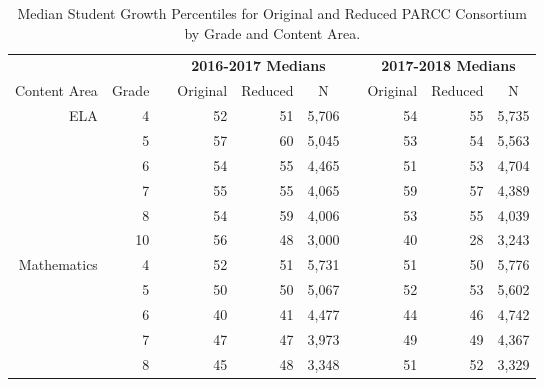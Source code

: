 \begin{table}[!tbp]
\caption{Median Student Growth Percentiles for Original and Reduced PARCC Consortium by Grade and Content Area.\label{}} 
\begin{center}
\begin{tabular}{rrcrrrcrrr}
\hline\hline
\multicolumn{2}{c}{\bfseries }&\multicolumn{1}{c}{\bfseries }&\multicolumn{3}{c}{\bfseries 2016-2017 Medians}&\multicolumn{1}{c}{\bfseries }&\multicolumn{3}{c}{\bfseries 2017-2018 Medians}\tabularnewline
\cline{4-6} \cline{8-10}
\multicolumn{1}{c}{Content Area}&\multicolumn{1}{c}{Grade}&\multicolumn{1}{c}{}&\multicolumn{1}{c}{Original}&\multicolumn{1}{c}{Reduced}&\multicolumn{1}{c}{N}&\multicolumn{1}{c}{}&\multicolumn{1}{c}{Original}&\multicolumn{1}{c}{Reduced}&\multicolumn{1}{c}{N}\tabularnewline
\hline
ELA& 4&&52&51&5,706&&54&55&5,735\tabularnewline
& 5&&57&60&5,045&&53&54&5,563\tabularnewline
& 6&&54&55&4,465&&51&53&4,704\tabularnewline
& 7&&55&55&4,065&&59&57&4,389\tabularnewline
& 8&&54&59&4,006&&53&55&4,039\tabularnewline
&10&&56&48&3,000&&40&28&3,243\tabularnewline
Mathematics& 4&&52&51&5,731&&51&50&5,776\tabularnewline
& 5&&50&50&5,067&&52&53&5,602\tabularnewline
& 6&&40&41&4,477&&44&46&4,742\tabularnewline
& 7&&47&47&3,973&&49&49&4,367\tabularnewline
& 8&&45&48&3,348&&51&52&3,329\tabularnewline
\hline
\end{tabular}\end{center}
\end{table}
